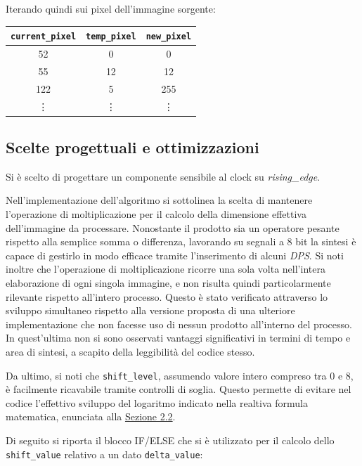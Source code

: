 \documentclass{article}
\begin{document}
Iterando quindi sui pixel dell'immagine sorgente:
\begin{center}
    \def\arraystretch{1.3} %
    \begin{tabular}{||c|c|c||} 
        \hline
        \texttt{current\_pixel} & \texttt{temp\_pixel} & \texttt{new\_pixel}\\
        \hline \hline
        52       & 0         & 0         \\\hline
        55       & 12        & 12        \\\hline
        122      & 5         & 255       \\\hline
        \vdots   & \vdots    & \vdots    \\\hline
    \end{tabular}        
\end{center}

\vspace{0,3cm}

\subsection{Scelte progettuali e ottimizzazioni} %
Si è scelto di progettare un componente sensibile al clock su \emph{rising\_edge}.\par
Nell’implementazione dell’algoritmo si sottolinea la scelta di mantenere l’operazione di moltiplicazione per il calcolo della dimensione effettiva dell’immagine da processare. Nonostante il prodotto sia un operatore pesante rispetto alla semplice somma o differenza, lavorando su segnali a 8 bit la sintesi è capace di gestirlo in modo efficace tramite l’inserimento di alcuni \emph{DPS}\footnotemark.
Si noti inoltre che l’operazione di moltiplicazione ricorre una sola volta nell’intera elaborazione di ogni singola immagine, e non risulta quindi particolarmente rilevante rispetto all’intero processo. Questo è stato verificato attraverso lo sviluppo simultaneo rispetto alla versione proposta di una ulteriore implementazione che non facesse uso di nessun prodotto all’interno del processo. In quest’ultima non si sono osservati vantaggi significativi in termini di tempo e area di sintesi, a scapito della leggibilità del codice stesso.\par
Da ultimo, si noti che \texttt{shift\_level}, assumendo valore intero compreso tra 0 e 8, è facilmente ricavabile tramite controlli di soglia. Questo permette di evitare nel codice l’effettivo sviluppo del logaritmo indicato nella realtiva formula matematica, enunciata alla \hyperref[sec:appr]{Sezione 2.2}.\par 
Di seguito si riporta il blocco IF/ELSE che si è utilizzato per il calcolo dello \texttt{shift\_value} relativo a un dato \texttt{delta\_value}:
\end{document}
